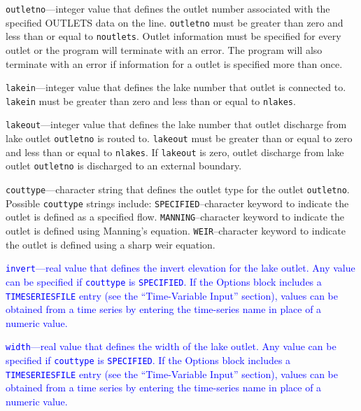 \begin{description}
\item \texttt{outletno}---integer value that defines the outlet number associated with the specified OUTLETS data on the line. \texttt{outletno} must be greater than zero and less than or equal to \texttt{noutlets}. Outlet information must be specified for every outlet or the program will terminate with an error. The program will also terminate with an error if information for a outlet is specified more than once.

\item \texttt{lakein}---integer value that defines the lake number that outlet is connected to. \texttt{lakein} must be greater than zero and less than or equal to \texttt{nlakes}.

\item \texttt{lakeout}---integer value that defines the lake number that outlet discharge from lake outlet \texttt{outletno} is routed to. \texttt{lakeout} must be greater than or equal to zero and less than or equal to \texttt{nlakes}. If \texttt{lakeout} is zero, outlet discharge from lake outlet \texttt{outletno} is discharged to an external boundary.

\item \texttt{couttype}---character string that defines the outlet type for the outlet \texttt{outletno}. Possible \texttt{couttype} strings include: \texttt{SPECIFIED}--character keyword to indicate the outlet is defined as a specified flow.  \texttt{MANNING}--character keyword to indicate the outlet is defined using Manning's equation. \texttt{WEIR}--character keyword to indicate the outlet is defined using a sharp weir equation.

\item \textcolor{blue}{\texttt{invert}---real value that defines the invert elevation for the lake outlet. Any value can be specified if \texttt{couttype} is \texttt{SPECIFIED}. If the Options block includes a \texttt{TIMESERIESFILE} entry (see the ``Time-Variable Input'' section), values can be obtained from a time series by entering the time-series name in place of a numeric value.}

\item \textcolor{blue}{\texttt{width}---real value that defines the width of the lake outlet. Any value can be specified if \texttt{couttype} is \texttt{SPECIFIED}. If the Options block includes a \texttt{TIMESERIESFILE} entry (see the ``Time-Variable Input'' section), values can be obtained from a time series by entering the time-series name in place of a numeric value.}


\end{description}
